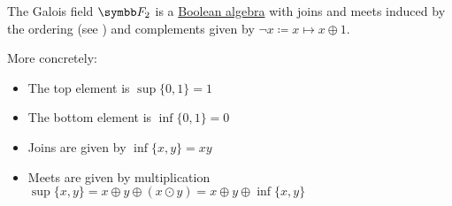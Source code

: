 \begin{Theorem}\label{thm:f2_is_boolean_algebra}
  The Galois field \( \BF_2 \) is a \hyperref[def:boolean_algebra]{Boolean algebra} with joins and meets induced by the ordering (see ) and complements given by \( \neg x \coloneqq x \mapsto x \oplus 1 \).

  More concretely:
  \begin{itemize}
    \item The top element is \( \sup \{ 0, 1 \} = 1 \)
    \item The bottom element is \( \inf \{ 0, 1 \} = 0 \)
    \item Joins are given by \( \inf \{ x, y \} = xy \)
    \item Meets are given by multiplication \( \sup \{ x, y \} = x \oplus y \oplus (x \odot y) = x \oplus y \oplus \inf \{ x, y \} \)
  \end{itemize}
\end{Theorem}
